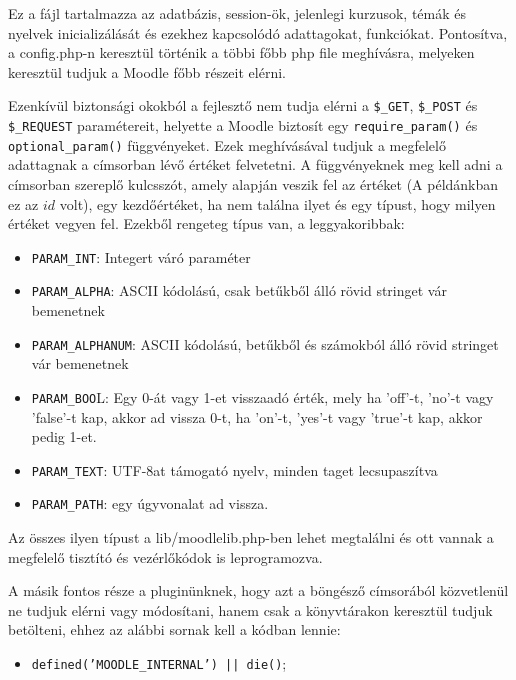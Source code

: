 Ez a fájl tartalmazza az adatbázis, session-ök, jelenlegi kurzusok, témák és nyelvek inicializálását és ezekhez kapcsolódó adattagokat, funkciókat. Pontosítva, a config.php-n keresztül történik a többi főbb php file meghívásra, melyeken keresztül tudjuk a Moodle főbb részeit elérni. \par

Ezenkívül biztonsági okokból a fejlesztő nem tudja elérni a \texttt{\$\_GET},  \texttt{\$\_POST} és \hfill \break \texttt{\$\_REQUEST} paramétereit, helyette a Moodle biztosít egy \texttt{require\_param()} és \hfill \break \texttt{optional\_param()} függvényeket. Ezek meghívásával tudjuk a megfelelő adattagnak a címsorban lévő értéket felvetetni. A függvényeknek meg kell adni a címsorban szereplő kulcsszót, amely alapján veszik fel az értéket (A példánkban ez az $id$ volt), egy kezdőértéket, ha nem találna ilyet és egy típust, hogy milyen értéket vegyen fel. Ezekből rengeteg típus van, a leggyakoribbak:

\begin{itemize}
    \item \texttt{PARAM\_INT}: Integert váró paraméter
    \item \texttt{PARAM\_ALPHA}: ASCII kódolású, csak betűkből álló rövid stringet vár bemenetnek
    \item \texttt{PARAM\_ALPHANUM}: ASCII kódolású, betűkből és számokból álló rövid stringet vár bemenetnek
    \item \texttt{PARAM\_BOO}L: Egy 0-át vagy 1-et visszaadó érték, mely ha 'off'-t, 'no'-t vagy 'false'-t kap, akkor ad vissza 0-t, ha 'on'-t, 'yes'-t vagy 'true'-t kap, akkor pedig 1-et.
    \item \texttt{PARAM\_TEXT}: UTF-8at támogató nyelv, minden taget lecsupaszítva
    \item \texttt{PARAM\_PATH}: egy úgyvonalat ad vissza.
\end{itemize}

Az összes ilyen típust a lib/moodlelib.php-ben lehet megtalálni és ott vannak a megfelelő tisztító és vezérlőkódok is leprogramozva.

A másik fontos része a pluginünknek, hogy azt a böngésző címsorából közvetlenül ne tudjuk elérni vagy módosítani, hanem csak a könyvtárakon keresztül tudjuk betölteni, ehhez az alábbi sornak kell a kódban lennie: \par
\begin{itemize}
    \item[] \texttt{defined('MOODLE\_INTERNAL') || die()};
\end{itemize}

